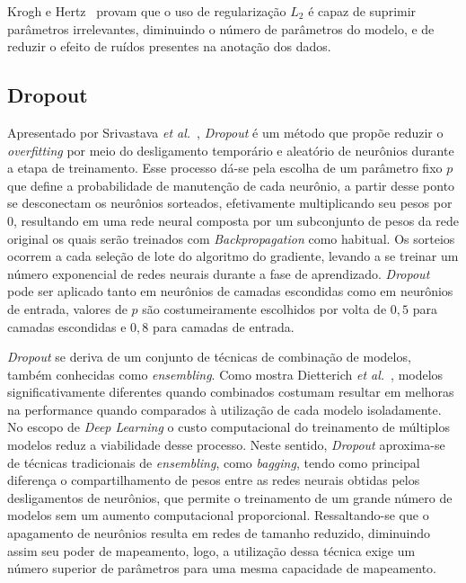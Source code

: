 Krogh e Hertz~\cite{krogh92} provam que o uso de regularização $L_{2}$ é capaz de suprimir parâmetros irrelevantes, diminuindo o número de parâmetros do modelo, e de reduzir o efeito de ruídos presentes na anotação dos dados.

\subsection{Dropout}

Apresentado por Srivastava \textit{et al.}~\cite{srivastava14}, \textit{Dropout} é um método que propõe reduzir o
\textit{overfitting} por meio do desligamento temporário e aleatório de neurônios durante a etapa de treinamento.
Esse processo dá-se pela escolha de um parâmetro fixo $p$ que define a probabilidade de manutenção de cada neurônio, a
partir desse ponto se desconectam os neurônios sorteados, efetivamente multiplicando seu pesos por 0, resultando em uma
rede neural composta por um subconjunto de pesos da rede original os quais serão treinados com \textit{Backpropagation}
como habitual.
Os sorteios ocorrem a cada seleção de lote do algoritmo do gradiente, levando a se treinar um número exponencial de
redes neurais durante a fase de aprendizado.
\textit{Dropout} pode ser aplicado tanto em neurônios de camadas escondidas como em neurônios de entrada, valores de
$p$ são costumeiramente escolhidos por volta de $0,5$ para camadas escondidas e $0,8$ para camadas de entrada.

\textit{Dropout} se deriva de um conjunto de técnicas de combinação de modelos, também conhecidas como \textit{ensembling}. Como mostra Dietterich \textit{et al.}~\cite{dietterich00}, modelos significativamente diferentes quando combinados costumam resultar em melhoras na performance quando comparados à utilização de cada modelo isoladamente. No escopo de \textit{Deep Learning} o custo computacional do treinamento de múltiplos modelos reduz a viabilidade desse processo. Neste sentido, \textit{Dropout} aproxima-se de técnicas tradicionais de \textit{ensembling}, como \textit{bagging}, tendo como principal diferença o compartilhamento de pesos entre as redes neurais obtidas pelos desligamentos de neurônios, que permite o treinamento de um grande número de modelos sem um aumento computacional proporcional. Ressaltando-se que o apagamento de neurônios resulta em redes de tamanho reduzido, diminuindo assim seu poder de mapeamento, logo, a utilização dessa técnica exige um número superior de parâmetros para uma mesma capacidade de mapeamento.

